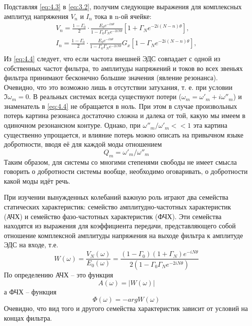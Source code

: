 Подставляя \eqref{eq:4.3} в \eqref{eq:3.2}, получим следующие выражения для комплексных амплитуд напряжения $V_n$ и $I_n$ тока в n-ой ячейке:
\begin{equation}
	\label{eq:4.4}
	\begin{gathered}
	V_n=\frac{1-\Gamma_0}{2}\cdot\frac{E_0e^{-in\theta}}{1-\Gamma_0\Gamma_Ne^{-2iN\theta}}\left[1+\Gamma_Ne^{-2i(N-n)\theta}\right],\\
	I_n=\frac{1-\Gamma_0}{2}\cdot\frac{E_0e^{-in\theta}}{1-\Gamma_0\Gamma_Ne^{-2iN\theta}}G_x\left[1-\Gamma_Ne^{-2i(N-n)\theta}\right],\\
	\end{gathered}
\end{equation}
Из \eqref{eq:4.4} следует, что если частота внешней ЭДС совпадает с одной из собственных частот фильтра, то амплитуды напряжений и токов во всех звеньях фильтра принимают бесконечно большие значения (явление резонанса). Очевидно, что это возможно лишь в отсутствии затухания, т. е. при условии $\Im\omega_m=0$. В реальных системах всегда существуют потери ($\omega_m=\omega'_m+i\omega''_m$) и знаменатель в \eqref{eq:4.4} не обращается в ноль. При этом в случае произвольных потерь картина резонанса достаточно сложна и далека от той, какую мы имеем в одиночном резонансном контуре. Однако, при $\omega''_m/\omega'_m<<1$ эта картина существенно упрощается, и влияние потерь можно описать на привычном языке добротности, вводя её для каждой моды отношением
\begin{equation}
\label{eq:4.5}
Q_m=\omega'_m/\omega''_m
\end{equation}
Таким образом, для системы со многими степенями свободы не имеет смысла говорить о добротности системы вообще, необходимо оговаривать, о добротности какой моды идёт речь.

При изучении вынужденных колебаний важную роль играют два семейства статических характеристик: семейство амплитудно-частотных характеристик (АЧХ) и семейство фазо-частотных характеристик (ФЧХ). Эти семейства находятся из выражения для коэффициента передачи, представляющего собой отношение комплексной амплитуды напряжения на выходе фильтра к амплитуде ЭДС на входе, т.е.
\begin{equation}
\label{eq:4.6}
W(\omega)=\frac{V_N(\omega)}{E_0(\omega)}=\frac{(1-\Gamma_0)(1+\Gamma_N)e^{-iN\theta}}{2\left(1-\Gamma_0\Gamma_Ne^{-2iN\theta}\right)}
\end{equation}
По определению АЧХ -- это функция 
\begin{equation}
\label{eq:4.7}
A(\omega)=|W(\omega)|
\end{equation}
а ФЧХ -- функция
\begin{equation}
\label{eq:4.8}
\Phi(\omega)=-argW(\omega)
\end{equation}
Очевидно, что вид того и другого семейства характеристик зависит от условий на концах фильтра.

